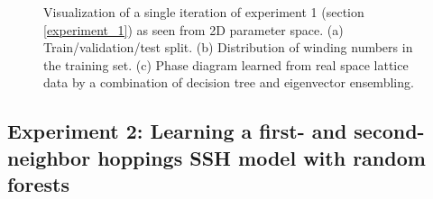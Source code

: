 \documentclass[10pt]{revtex4-1}
\begin{document}
\begin{figure}
\centering
{}\quad
{}
\caption{Visualization of a single iteration of experiment 1 (section \ref{experiment_1}) as seen from 2D parameter space. (a) Train/validation/test split. (b) Distribution of winding numbers in the training set. (c) Phase diagram learned from real space lattice data by a combination of decision tree and eigenvector ensembling.}
\label{figexp1_exp}
\end{figure}

\subsection{Experiment 2: Learning a first- and second-neighbor hoppings SSH model with random forests}
\label{experiment_2}
\end{document}
